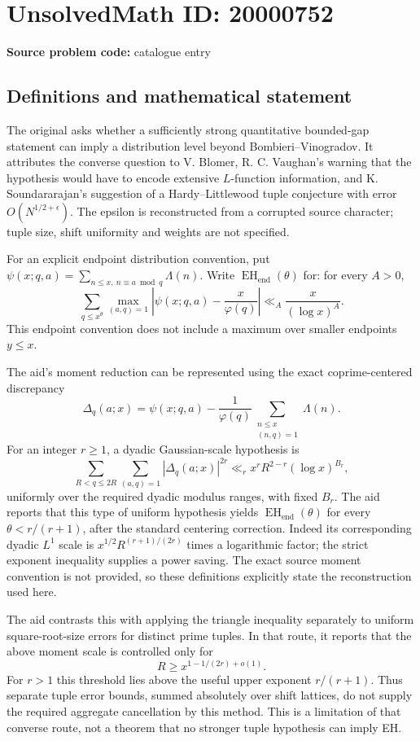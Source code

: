 \documentclass[11pt]{article}
\begin{document}
\section*{UnsolvedMath ID: 20000752}
\textbf{Source problem code:} catalogue entry
\subsection{Definitions and mathematical statement}
The original asks whether a sufficiently strong quantitative bounded-gap statement can imply a distribution level beyond Bombieri--Vinogradov. It attributes the converse question to V. Blomer, R. C. Vaughan's warning that the hypothesis would have to encode extensive $L$-function information, and K. Soundararajan's suggestion of a Hardy--Littlewood tuple conjecture with error $O(N^{1/2+\epsilon})$. The epsilon is reconstructed from a corrupted source character; tuple size, shift uniformity and weights are not specified.

For an explicit endpoint distribution convention, put $\psi(x;q,a)=\sum_{n\le x,\ n\equiv a\bmod q}\Lambda(n)$. Write $\operatorname{EH}_{\mathrm{end}}(\theta)$ for: for every $A>0$,
\[
\sum_{q\le x^\theta}\max_{(a,q)=1}\left|\psi(x;q,a)-\frac{x}{\varphi(q)}\right|
\ll_A \frac{x}{(\log x)^A}.
\]
This endpoint convention does not include a maximum over smaller endpoints $y\le x$.

The aid's moment reduction can be represented using the exact coprime-centered discrepancy
\[
\Delta_q(a;x)=\psi(x;q,a)-\frac1{\varphi(q)}\sum_{\substack{n\le x\\(n,q)=1}}\Lambda(n).
\]
For an integer $r\ge1$, a dyadic Gaussian-scale hypothesis is
\[
\sum_{R<q\le2R}\sum_{(a,q)=1}|\Delta_q(a;x)|^{2r}
\ll_r x^r R^{2-r}(\log x)^{B_r},
\]
uniformly over the required dyadic modulus ranges, with fixed $B_r$. The aid reports that this type of uniform hypothesis yields $\operatorname{EH}_{\mathrm{end}}(\theta)$ for every $\theta<r/(r+1)$, after the standard centering correction. Indeed its corresponding dyadic $L^1$ scale is $x^{1/2}R^{(r+1)/(2r)}$ times a logarithmic factor; the strict exponent inequality supplies a power saving. The exact source moment convention is not provided, so these definitions explicitly state the reconstruction used here.

The aid contrasts this with applying the triangle inequality separately to uniform square-root-size errors for distinct prime tuples. In that route, it reports that the above moment scale is controlled only for
\[
R\ge x^{1-1/(2r)+o(1)}.
\]
For $r>1$ this threshold lies above the useful upper exponent $r/(r+1)$. Thus separate tuple error bounds, summed absolutely over shift lattices, do not supply the required aggregate cancellation by this method. This is a limitation of that converse route, not a theorem that no stronger tuple hypothesis can imply EH.
\end{document}
